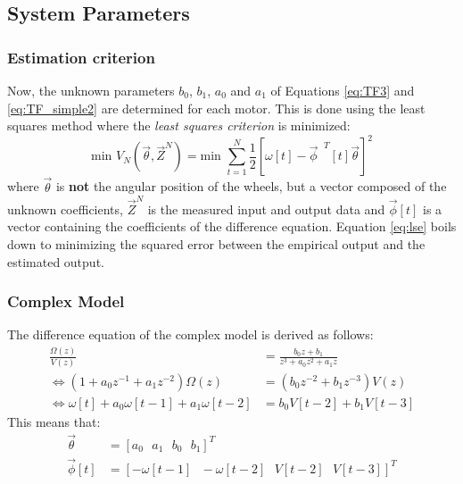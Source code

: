 \documentclass[a4paper,kul]{kulakarticle} %
\begin{document}

\subsection{System Parameters}
\label{subsec:lse}
\subsubsection{Estimation criterion}

Now, the unknown parameters $b_0$, $b_1$, $a_0$ and $a_1$ of Equations \ref{eq:TF3} and \ref{eq:TF_simple2} are determined for each motor. This is done using the least squares method where the \textit{least squares criterion} is minimized: 
\begin{equation}
	\label{eq:lse}
	\text{min } V_N (\vec{\theta}, \vec{Z}^N) = \text{min }\sum_{t = 1}^{N}\frac{1}{2} \left[\omega[t] - \vec{\phi}^{\text{ }T}[t]\vec{\theta}\right]^2
\end{equation}
where $\vec{\theta}$ is \textbf{not} the angular position of the wheels, but a vector composed of the unknown coefficients, $\vec{Z}^N$ is the measured input and output data and $\vec{\phi}[t]$ is a vector containing the coefficients of the difference equation. Equation \ref{eq:lse} boils down to minimizing the squared error between the empirical output and the estimated output. 


\subsubsection*{Complex Model}
The difference equation of the complex model is derived as follows:
\begin{equation}
\begin{split}
\frac{\Omega(z)}{V(z)} &= \frac{b_0z + b_1}{z^3 + a_0 z^2 + a_1 z} \\
\iff (1 + a_0 z^{-1} + a_1 z^{-2})\Omega(z) &= (b_0 z^{-2} + b_1 z^{-3})V(z) \\
\iff \omega[t] + a_0 \omega[t-1] + a_1 \omega[t-2] &= b_0 V[t-2] + b_1 V[t-3] 
\end{split}
\end{equation}
This means that:
\begin{equation}
\begin{split}
\vec{\theta} &= \left[a_0\text{ }a_1\text{ }b_0\text{ }b_1\right]^T \\
\vec{\phi}[t] &= \left[-\omega[t-1]\text{ }-\omega[t-2]\text{ }V[t-2]\text{ }V[t-3]\right]^T
\end{split}
\end{equation}
\end{document}
